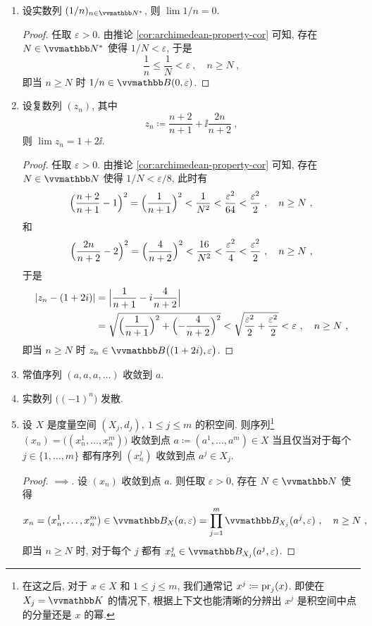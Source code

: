 \begin{example}\label{eg:ez-convergent-sequence}
    \begin{enumerate}
        \item 设实数列 \((1 / n)_{n \in \N^\ast}\), 则 \(\lim 1 / n = 0\).
        \begin{proof}
            任取 \(\varepsilon > 0\). 由推论 \ref{cor:archimedean-property-cor} 可知, 存在 \(N \in \N^\ast\) 使得 \(1 / N < \varepsilon\), 于是
            \[
                \frac{1}{n} \leq \frac{1}{N} < \varepsilon\ ,\quad n \geq N\ ,
            \]
            即当 \(n \geq N\) 时 \(1 / n \in \B(0, \varepsilon)\).
        \end{proof}
        \item 设复数列 \((z_n)\), 其中
        \[
            z_n \coloneqq \frac{n + 2}{n + 1} + \ii \frac{2 n}{n + 2}\ ,
        \]
        则 \(\lim z_n = 1 + 2 \ii\).
        \begin{proof}
            任取 \(\varepsilon > 0\). 由推论 \ref{cor:archimedean-property-cor} 可知, 存在 \(N \in \N\) 使得 \(1 / N < \varepsilon / 8\), 此时有
            \[
                \Bigl(\frac{n + 2}{n + 1} - 1\Bigr)^2 = \Bigl(\frac{1}{n + 1}\Bigr)^2 < \frac{1}{N^2} < \frac{\varepsilon^2}{64} < \frac{\varepsilon^2}{2}\ ,\quad n \geq N\ ,
            \]
            和
            \[
                \Bigl(\frac{2 n}{n + 2} - 2\Bigr)^2 = \Bigl(\frac{4}{n + 2}\Bigr)^2 < \frac{16}{N^2} < \frac{\varepsilon^2}{4} < \frac{\varepsilon^2}{2}\ ,\quad n \geq N\ ,
            \]
            于是
            \begin{align*}
                |z_n - (1 + 2 i)| &= \Bigl|\frac{1}{n + 1} - i \frac{4}{n + 2}\Bigr| \\
                &= \sqrt{\Bigl(\frac{1}{n + 1}\Bigr)^2 + \Bigl(- \frac{4}{n + 2}\Bigr)^2} < \sqrt{\frac{\varepsilon^2}{2} + \frac{\varepsilon^2}{2}} < \varepsilon\ ,\quad n \geq N\ ,
            \end{align*}
            即当 \(n \geq N\) 时 \(z_n \in \B\bigl((1 + 2 \ii), \varepsilon\bigr)\).
        \end{proof}
        \item 常值序列 \((a, a, a, \ldots)\) 收敛到 \(a\).
        \item 实数列 \(\bigl((- 1)^n\bigr)\) 发散.
        \item 设 \(X\) 是度量空间 \((X_j, d_j),\ 1 \leq j \leq m\) 的积空间. 则序列\footnote{在这之后, 对于 \(x \in X\) 和 \(1 \leq j \leq m\), 我们通常记 \(x^j \coloneqq \operatorname{pr}_j(x)\). 即使在 \(X_j = \K\) 的情况下, 根据上下文也能清晰的分辨出 \(x^j\) 是积空间中点的分量还是 \(x\) 的幂.} \((x_n) = \bigl((x_n^1, \ldots, x_n^m)\bigr)\) 收敛到点 \(a \coloneqq (a^1, \ldots, a^m) \in X\) 当且仅当对于每个 \(j \in \{1, \ldots, m\}\) 都有序列 \((x_n^j)\) 收敛到点 \(a^j \in X_j\).
        \begin{proof}
            \(\implies\). 设 \((x_n)\) 收敛到点 \(a\). 则任取 \(\varepsilon > 0\), 存在 \(N \in \N\) 使得
            \[
                x_n = (x_n^1, \ldots, x_n^m) \in \B_X(a, \varepsilon) = \prod_{j = 1}^m \B_{X_j}(a^j, \varepsilon)\ ,\quad n \geq N\ ,
            \]
            即当 \(n \geq N\) 时, 对于每个 \(j\) 都有 \(x_n^j \in \B_{X_j}(a^j, \varepsilon)\).


\end{proof}
\end{enumerate}
\end{example}
